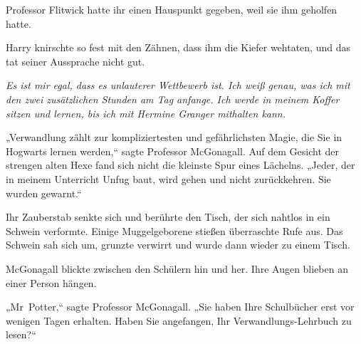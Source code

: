 Professor Flitwick hatte ihr einen Hauspunkt gegeben, weil sie ihm geholfen hatte.

Harry knirschte so fest mit den Zähnen, dass ihm die Kiefer wehtaten, und das tat seiner Aussprache nicht gut.

\emph{Es ist mir egal, dass es unlauterer Wettbewerb ist. Ich weiß genau, was ich mit den zwei zusätzlichen Stunden am Tag anfange. Ich werde in meinem Koffer sitzen und lernen, bis ich mit Hermine Granger mithalten kann.}

\later

„Verwandlung zählt zur kompliziertesten und gefährlichsten Magie, die Sie in Hogwarts lernen werden,“ sagte Professor McGonagall. Auf dem Gesicht der strengen alten Hexe fand sich nicht die kleinste Spur eines Lächelns. „Jeder, der in meinem Unterricht Unfug baut, wird gehen und nicht zurückkehren. Sie wurden gewarnt.“

Ihr Zauberstab senkte sich und berührte den Tisch, der sich nahtlos in ein Schwein verformte. Einige Muggelgeborene stießen überraschte Rufe aus. Das Schwein sah sich um, grunzte verwirrt und wurde dann wieder zu einem Tisch.

McGonagall blickte zwischen den Schülern hin und her. Ihre Augen blieben an einer Person hängen.

„Mr~Potter,“ sagte Professor McGonagall. „Sie haben Ihre Schulbücher erst vor wenigen Tagen erhalten. Haben Sie angefangen, Ihr Verwandlungs-Lehrbuch zu lesen?“

